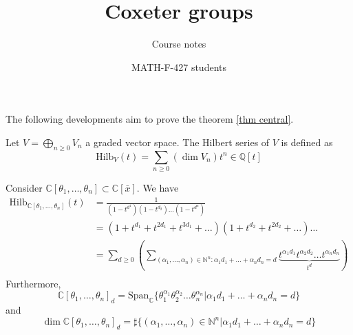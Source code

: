 \documentclass[envcountsame,envcountchap]{svmono}
\begin{document}
\author{MATH-F-427 students}
\title{Coxeter groups}
\subtitle{Course notes}
\maketitle

\frontmatter%

\tableofcontents

The following developments aim to prove the theorem \ref{thm central}. 

\begin{definition}
Let $V = \bigoplus_{n \ge 0} V_n$ a graded vector space. The Hilbert series of $V$ is defined as
\begin{equation}
\text{Hilb}_V (t) = \sum_{n\ge 0} (\dim V_n)t^n \in \mathbb{Q}[t]
\end{equation}
\end{definition}

\begin{example}
Consider $\mathbb{C}[\theta_1, \ldots , \theta_n ] \subset \mathbb{C}[\bar{x}]$. We have
\begin{equation}
\begin{split}
\text{Hilb}_{\mathbb{C}[\theta_1, \ldots , \theta_n ]}(t) &= \frac{1}{(1-t^{d^1})(1-t^{d_2}) \ldots (1-t^{d^n})} \\
&= (1+ t^{d_1} + t^{2d_1} + t^{3d_1} + \ldots ) (1+ t^{d_2} + t^{2d_2} + \ldots ) \ldots \\
&= \sum_{d\ge 0} \left( \sum_{(\alpha_1, \ldots, \alpha_n) \in \mathbb{N}^n: \alpha_1 d_1 + \ldots + \alpha_n d_n = d} \underbrace{t^{\alpha_1 d_1} t^{\alpha_2 d_2} \ldots t^{\alpha_n d_n}}_{t^d} \right) \\
\end{split}
\end{equation} Furthermore,
\begin{equation}
\mathbb{C}[\theta_1, \ldots , \theta_n ]_d = \text{Span}_\mathbb{C} \{ \theta_1^{\alpha_1} \theta_2^{\alpha_2} \ldots \theta_n^{\alpha_n} | \alpha_1 d_1 + \ldots + \alpha_n d_n = d \}
\end{equation} and 
\begin{equation}
\dim \mathbb{C}[\theta_1, \ldots , \theta_n ]_d = \sharp \{ (\alpha_1, \ldots, \alpha_n) \in \mathbb{N}^n | \alpha_1 d_1 + \ldots + \alpha_n d_n = d\}
\end{equation}
\end{example}
\end{document}
